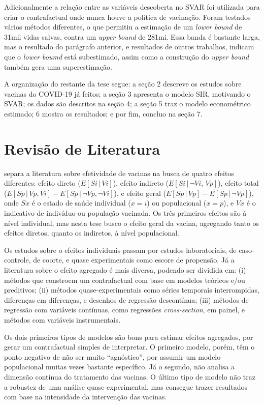 \documentclass[
	12pt,				%
	oneside,			%
	a4paper,			%
	english,			%
	brazil				%
	hyperref = {colorlinks, citecolor=c1d, linkcolor=c2d, urlcolor=c3d, colorlinks}
	]{abntex2}
\newcounter{j}
\begin{document}
Adicionalmente a relação entre as variáveis descoberta no SVAR foi utilizada para criar o contrafactual onde nunca houve a política de vacinação. Foram testados vários métodos diferentes, o que permitiu a estimação de um \textit{lower bound} de 31mil vidas salvas, contra um \textit{upper bound} de 281mi. Essa banda é bastante larga, mas o resultado do parágrafo anterior, e resultados de outros trabalhos, indicam que o \textit{lower boumd} está subestimado, assim como a construção do \textit{upper bound} também gera uma superestimação.

A organização do restante da tese segue: a seção 2 descreve os estudos sobre vacinas do COVID-19 já feitos; a seção 3 apresenta o modelo SIR, motivando o SVAR; os dados são descritos na seção 4; a seção 5 traz o modelo econométrico estimado; 6 mostra os resultados; e por fim, concluo na seção 7.

\let\clearpage\relax
\chapter{Revisão de Literatura}
\cite{Halloran1999} separa a literatura sobre efetividade de vacinas na busca de quatro efeitos diferentes: efeito direto ($E[Si \,|\, Vi]$), efeito indireto ($E[Si \,|\, \neg Vi,\, Vp]$), efeito total ($E[Sp \,|\, Vp, Vi] - E[Sp \,|\, \neg Vp, \neg Vi]$), e efeito geral ($E[Sp \,|\, Vp] - E[Sp \,|\, \neg Vp]$), onde $Sx$ é o estado de saúde individual ($x=i$) ou populacional ($x=p$), e $Vx$ é o indicativo de indivíduo ou população vacinada. Os três primeiros efeitos são à nível individual, mas nesta tese busco o efeito geral da vacina, agregando tanto os efeitos diretos, quanto os indiretos, à nível populacional.

Os estudos sobre o efeitos individuais passam por estudos laboratoriais, de caso-controle, de coorte, e quase experimentais como escore de propensão. Já a literatura sobre o efeito agregado é mais diversa, podendo ser dividida em: (i) métodos que constroem um contrafactual com base em modelos teóricos e/ou preditivos; (ii) métodos quase-experimentais como séries temporais interrompidas, diferenças em diferenças, e desenhos de regressão descontínua; (iii) métodos de regressão com variáveis contínuas, como regressões \textit{cross-section}, em painel, e métodos com variáveis instrumentais.

Os dois primeiros tipos de modelos são bons para estimar efeitos agregados, por gerar um contrafactual simples de interpretar. O primeiro modelo, porém, têm o ponto negativo de não ser muito ``agnóstico'', por assumir um modelo populacional muitas vezes bastante específico. Já o segundo, não analisa a dimensão contínua do tratamento das vacinas. O último tipo de modelo não traz a robustez de uma análise quase-experimental, mas consegue trazer resultados com base na intensidade da intervenção das vacinas.
\end{document}
